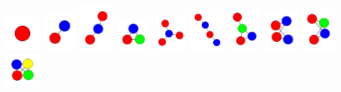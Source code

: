 \documentclass[openany]{tufte-book} %
\theoremstyle{plain}
\begin{document}
\begin{marginfigure}
		\includegraphics[width=0.5in]{graphs/all/0.pdf}
		\includegraphics[width=0.5in]{graphs/all/1.pdf}
		\includegraphics[width=0.5in]{graphs/all/011.pdf}
		\includegraphics[width=0.5in]{graphs/all/111.pdf}
		\includegraphics[width=0.5in]{graphs/all/001011.pdf}
		\includegraphics[width=0.5in]{graphs/all/011010.pdf}
		\includegraphics[width=0.5in]{graphs/all/011011.pdf}
		\includegraphics[width=0.5in]{graphs/all/011110.pdf}
		\includegraphics[width=0.5in]{graphs/all/011111.pdf}
		\includegraphics[width=0.5in]{graphs/all/111111.pdf}

\end{marginfigure}
\end{document}
